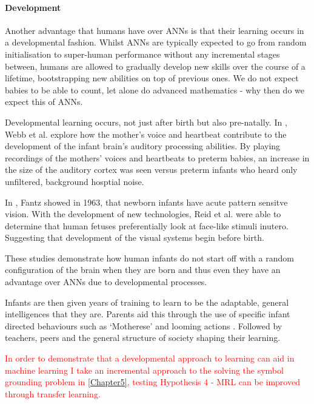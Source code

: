 \paragraph{Development}
Another advantage that humans have over \acp{ANN} is that their learning occurs in a developmental fashion. Whilst \acp{ANN} are typically expected to go from random initialisation to super-human performance without any incremental stages between, humans are allowed to gradually develop new skills over the course of a lifetime, bootstrapping new abilities on top of previous ones. We do not expect babies to be able to count, let alone do advanced mathematics - why then do we expect this of \acp{ANN}.

Developmental learning occurs, not just after birth but also pre-natally. In \cite{webb2015mother}, Webb et al. explore how the mother's voice and heartbeat contribute to the development of the infant brain's auditory processing abilities. By playing recordings of the mothers' voices and heartbeats to preterm babies, an increase in the size of the auditory cortex was seen versus preterm infants who heard only unfiltered, background hosptial noise.


In \cite{fantz1963pattern}, Fantz showed in 1963, that newborn infants have acute pattern sensitve vision. With the development of new technologies, Reid et al. \cite{reid2017human} were able to determine that human fetuses preferentially look at face-like stimuli inutero. Suggesting that development of the visual systems begin before birth.

These studies demonstrate how human infants do not start off with a random configuration of the brain when they are born and thus even they have an advantage over \acp{ANN} due to developmental processes.

Infants are then given years of training to learn to be the adaptable, general intelligences that they are. Parents aid this through the use of specific infant directed behaviours such as `Motherese' \cite{fernald1987acoustic} and looming actions \cite{lohan2012contingency, lohan2012tutor}. Followed by teachers, peers and the general structure of society shaping their learning.

\textcolor{red}{In order to demonstrate that a developmental approach to learning can aid in machine learning I take an incremental approach to the solving the symbol grounding problem in \autoref{Chapter5}, testing Hypothesis 4 - \ac{MRL} can be improved through transfer learning.} 

